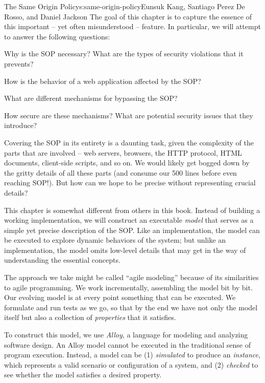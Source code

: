 \begin{aosachapter}{The Same Origin Policy}{s:same-origin-policy}{Eunsuk Kang, Santiago Perez De Rosso, and Daniel Jackson}
The goal of this chapter is to capture the essence of this important --
yet often misunderstood -- feature. In particular, we will attempt to
answer the following questions:

\begin{aosaitemize}

\item
  Why is the SOP necessary? What are the types of security violations
  that it prevents?
\item
  How is the behavior of a web application affected by the SOP?
\item
  What are different mechanisms for bypassing the SOP?
\item
  How secure are these mechanisms? What are potential security issues
  that they introduce?
\end{aosaitemize}

Covering the SOP in its entirety is a daunting task, given the
complexity of the parts that are involved -- web servers, browsers, the
HTTP protocol, HTML documents, client-side scripts, and so on. We would
likely get bogged down by the gritty details of all these parts (and
consume our 500 lines before even reaching SOP!). But how can we hope to
be precise without representing crucial details?

\label{modeling-with-alloy}

This chapter is somewhat different from others in this book. Instead of
building a working implementation, we will construct an executable
\emph{model} that serves as a simple yet precise description of the SOP.
Like an implementation, the model can be executed to explore dynamic
behaviors of the system; but unlike an implementation, the model omits
low-level details that may get in the way of understanding the essential
concepts.

The approach we take might be called ``agile modeling'' because of its
similarities to agile programming. We work incrementally, assembling the
model bit by bit. Our evolving model is at every point something that
can be executed. We formulate and run tests as we go, so that by the end
we have not only the model itself but also a collection of
\emph{properties} that it satisfies.

To construct this model, we use \emph{Alloy}, a language for modeling
and analyzing software design. An Alloy model cannot be executed in the
traditional sense of program execution. Instead, a model can be (1)
\emph{simulated} to produce an \emph{instance}, which represents a valid
scenario or configuration of a system, and (2) \emph{checked} to see
whether the model satisfies a desired property.


\end{aosachapter}
